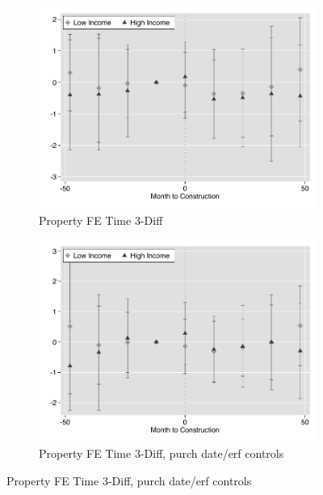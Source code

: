 \documentclass[12pt]{article}
\begin{document}
\begin{figure}
 \begin{subfigure}[b]{0.48\textwidth}
                    \caption[Network2]%
            {{\footnotesize Property FE Time 3-Diff}}    
            \label{fig:prefor}
            \centering
            \includegraphics[width=\textwidth,trim={0.3cm .3cm 0.1cm 0cm}, clip=true]{figures/price_time_3d_no_ctrl_pfe}
        \end{subfigure}
        \hfill
        \begin{subfigure}[b]{0.48\textwidth}
                    \caption[Network2]%
            {{\footnotesize Property FE Time 3-Diff, purch date/erf controls}}    
            \label{fig:prefor}
            \centering
            \includegraphics[width=\textwidth,trim={0.3cm .3cm 0.1cm 0cm}, clip=true]{figures/price_time_3d_ctrl_pfe}

\end{subfigure}
\end{figure}
\end{document}
